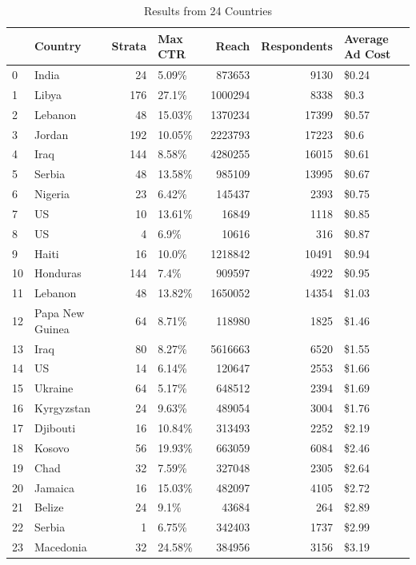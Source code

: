 \begin{table}[t]
    \centering
    \caption{Results from 24 Countries}
        \label{country-results}
    \vspace*{0.2cm}
\begin{tabular}{llrlrrl}
\toprule
 & Country & Strata & Max CTR & Reach & Respondents & Average Ad Cost \\
\midrule
0 & India & 24 & 5.09\% & 873653 & 9130 & \$0.24 \\
1 & Libya & 176 & 27.1\% & 1000294 & 8338 & \$0.3 \\
2 & Lebanon & 48 & 15.03\% & 1370234 & 17399 & \$0.57 \\
3 & Jordan & 192 & 10.05\% & 2223793 & 17223 & \$0.6 \\
4 & Iraq & 144 & 8.58\% & 4280255 & 16015 & \$0.61 \\
5 & Serbia & 48 & 13.58\% & 985109 & 13995 & \$0.67 \\
6 & Nigeria & 23 & 6.42\% & 145437 & 2393 & \$0.75 \\
7 & US & 10 & 13.61\% & 16849 & 1118 & \$0.85 \\
8 & US & 4 & 6.9\% & 10616 & 316 & \$0.87 \\
9 & Haiti & 16 & 10.0\% & 1218842 & 10491 & \$0.94 \\
10 & Honduras & 144 & 7.4\% & 909597 & 4922 & \$0.95 \\
11 & Lebanon & 48 & 13.82\% & 1650052 & 14354 & \$1.03 \\
12 & Papa New Guinea & 64 & 8.71\% & 118980 & 1825 & \$1.46 \\
13 & Iraq & 80 & 8.27\% & 5616663 & 6520 & \$1.55 \\
14 & US & 14 & 6.14\% & 120647 & 2553 & \$1.66 \\
15 & Ukraine & 64 & 5.17\% & 648512 & 2394 & \$1.69 \\
16 & Kyrgyzstan & 24 & 9.63\% & 489054 & 3004 & \$1.76 \\
17 & Djibouti & 16 & 10.84\% & 313493 & 2252 & \$2.19 \\
18 & Kosovo & 56 & 19.93\% & 663059 & 6084 & \$2.46 \\
19 & Chad & 32 & 7.59\% & 327048 & 2305 & \$2.64 \\
20 & Jamaica & 16 & 15.03\% & 482097 & 4105 & \$2.72 \\
21 & Belize & 24 & 9.1\% & 43684 & 264 & \$2.89 \\
22 & Serbia & 1 & 6.75\% & 342403 & 1737 & \$2.99 \\
23 & Macedonia & 32 & 24.58\% & 384956 & 3156 & \$3.19 \\

\end{tabular}
\end{table}
